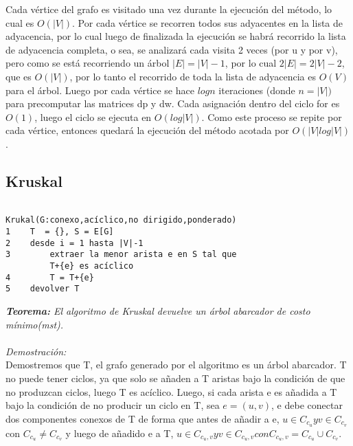 \documentclass[12pt]{article}
\begin{document}
Cada v\'ertice del grafo es visitado una vez durante la ejecuci\'on del m\'etodo, lo cual es $O (|V|)$.  Por cada v\'ertice se recorren todos sus
adyacentes en la lista de adyacencia, por lo cual luego de finalizada la ejecuci\'on se habr\'a recorrido  la lista de adyacencia completa, o sea,
se analizar\'a cada visita 2 veces (por u y por v), pero como se est\'a recorriendo un \'arbol $|E| = |V| - 1$, por lo cual $2|E| = 2|V| - 2$, que
es $O(|V|)$, por lo tanto el recorrido de toda la lista de adyacencia es $O(V)$ para el \'arbol.  Luego por cada v\'ertice se hace $logn$ iteraciones 
(donde $n = |V|)$ para precomputar las matrices dp y dw. Cada asignaci\'on dentro del ciclo for es $O(1)$, luego el ciclo se ejecuta en
$O(log |V|)$. Como este proceso se repite por cada v\'ertice, entonces quedar\'a la ejecuci\'on  del m\'etodo acotada por 
$O (|V|log|V|)$.\\







\subsection{\textbf{Kruskal}}

\begin{verbatim}

Krukal(G:conexo,acíclico,no dirigido,ponderado)
1    T  = {}, S = E[G]
2    desde i = 1 hasta |V|-1
3        extraer la menor arista e en S tal que
         T+{e} es acíclico
4        T = T+{e}
5    devolver T
\end{verbatim}

\textit{\textbf{Teorema:} El algoritmo de Kruskal devuelve un \'arbol abarcador de costo m\'inimo(mst).}\\
\\
\textit{Demostraci\'on:}\\

Demostremos que T, el grafo generado por el algoritmo es un \'arbol abarcador.  T no puede tener ciclos, ya que solo se a\~naden a T aristas bajo
la condici\'on de que no produzcan ciclos, luego T es ac\'iclico.
Luego, si cada arista e es a\~nadida a T bajo la condici\'on de no producir un ciclo en T, 
sea $e = (u, v)$, e debe conectar dos componentes conexos de T de forma que antes de a\~nadir a e, $u \in C_{c_u} y v \in C_{c_v}$
con $C_{c_u} \neq C_{c_v}$ y luego de  a\~nadido e a T, $u \in C_{c_u,v} y v \in C_{c_u,v} con C_{c_u,v} = C_{c_u} \cup C_{c_v}$. \\
\end{document}
